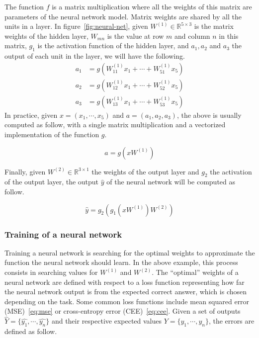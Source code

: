 The function $f$ is a matrix multiplication where all the weights of this matrix
are parameters of the neural network model. Matrix weights are shared by all the
units in a layer. In figure~\ref{fig:neural-net}, given $W^{(1)} \in
\mathbb{R}^{5\times 3}$ is the matrix weights of the hidden layer, $W_{mn}$ is
the value at row $m$ and column $n$ in this matrix, $g_1$ is the activation
function of the hidden layer, and $a_1, a_2$ and $a_3$ the output of each unit
in the layer, we will have the following.
\begin{align*}
  a_1 &= g\left( W_{11}^{(1)}x_1 + \cdots + W_{51}^{(1)}x_5 \right)\\
  a_2 &= g\left( W_{12}^{(1)}x_1 + \cdots + W_{52}^{(1)}x_5 \right)\\
  a_3 &= g\left(W_{13}^{(1)}x_1 + \cdots + W_{53}^{(1)}x_5 \right)
\end{align*}
In practice, given $x = (x_1, \cdots, x_5)$ and $a = (a_1, a_2, a_3)$, the above
is usually computed as follow, with a single matrix multiplication and a
vectorized implementation of the function $g$.

\[ a = g\left(  x W^{(1)}  \right) \]

Finally, given $W^{(2)} \in \mathbb{R}^{3\times 1}$ the weights of the output
layer and $g_2$ the activation of the output layer, the output $\hat{y}$ of the neural
network will be computed as follow.

\begin{equation}
  \hat{y} = g_2\left( g_1\left( x W^{(1)} \right) W^{(2)} \right)
\end{equation}
\subsubsection{Training of a neural network}
Training a neural network is searching for the optimal weights to approximate
the function the neural network should learn. In the above example, this process
consists in searching values for $W^{(1)}$ and $W^{(2)}$.
The ``optimal'' weights of a neural network are defined with respect to a loss
function representing how far the neural network output is from the expected
correct answer, which is chosen depending on the task. Some common loss
functions include mean squared error (MSE)~\ref{eq:mse} or cross-entropy
error (CEE)~\ref{eq:cee}. Given a set of outputs $\hat{Y} = \{ \hat{y_1}, \cdots,
\hat{y_n} \}$ and their respective expected values $Y = \{ y_1, \cdots,
y_n \}$, the errors are defined as follow.

